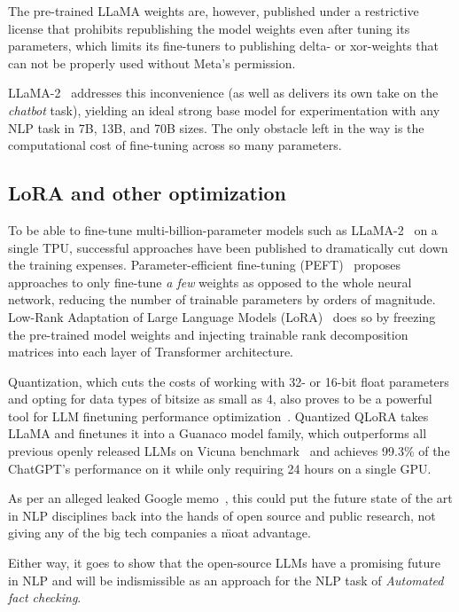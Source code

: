 The pre-trained LLaMA weights are, however, published under a restrictive license that prohibits republishing the model weights even after tuning its parameters, which limits its fine-tuners to publishing delta- or xor-weights that can not be properly used without \textsf{Meta}'s permission.

LLaMA-2~\cite{llama2} addresses this inconvenience (as well as delivers its own take on the \textit{chatbot} task), yielding an ideal strong base model for experimentation with any NLP task in 7B, 13B, and 70B sizes.
The only obstacle left in the way is the computational cost of fine-tuning across so many parameters.


\subsection{LoRA and other optimization}\label{sec:lora}
To be able to fine-tune multi-billion-parameter models such as \textsf{LLaMA-2}~\cite{llama2} on a single TPU, successful approaches have been published to dramatically cut down the training expenses.
Parameter-efficient fine-tuning (PEFT)~\cite{peft} proposes approaches to only fine-tune \textit{a few} weights as opposed to the whole neural network, reducing the number of trainable parameters by orders of magnitude.
Low-Rank Adaptation of Large Language Models (LoRA)~\cite{lora} does so by freezing the pre-trained model weights and injecting trainable rank decomposition matrices into each layer of Transformer architecture. 

Quantization, which cuts the costs of working with 32- or 16-bit float parameters and opting for data types of bitsize as small as 4, also proves to be a powerful tool for LLM finetuning performance optimization~\cite{dettmers2023qlora}.
Quantized QLoRA takes LLaMA and finetunes it into a Guanaco model family, which outperforms all previous openly released LLMs on Vicuna benchmark~\cite{dettmers2023qlora} and achieves 99.3\% of the ChatGPT's performance on it while only requiring 24 hours on a single GPU.

As per an alleged leaked Google memo~\cite{moat}, this could put the future state of the art in NLP disciplines back into the hands of open source and public research, not giving any of the big tech companies a \"{moat} advantage.

Either way, it goes to show that the open-source LLMs have a promising future in NLP and will be indismissible as an approach for the NLP task of \textit{Automated fact checking}.

